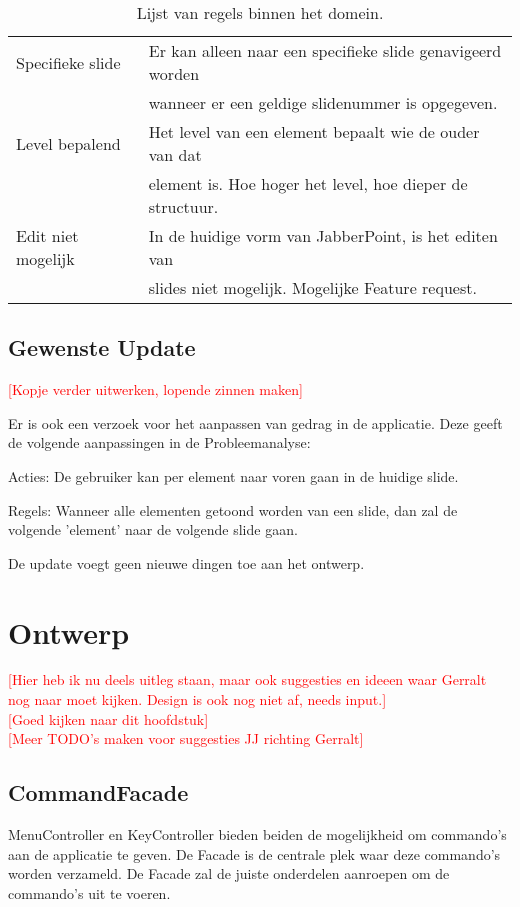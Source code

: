 \documentclass[a4paper]{article}
\newcommand{\todo}[1]{\textcolor{red}{[#1]}}
\newcommand{\1}[0]{\'{e}\'{e}n}
\begin{document}
\begin{table}[!h]
\begin{tabular}{ll}
 	Specifieke slide & Er kan alleen naar een specifieke slide genavigeerd worden \\& wanneer er een geldige slidenummer is opgegeven.\\
 	Level bepalend & Het level van een element bepaalt wie de ouder van dat \\& element is. Hoe hoger het level, hoe dieper de structuur.\\
 	Edit niet mogelijk & In de huidige vorm van JabberPoint, is het editen van \\& slides niet mogelijk. Mogelijke Feature request.\\
  	\bottomrule
	\end{tabular}
\caption{Lijst van regels binnen het domein.}
\label{table:regels}
\end{table}

\subsection{Gewenste Update}
\todo{Kopje verder uitwerken, lopende zinnen maken}

Er is ook een verzoek voor het aanpassen van gedrag in de applicatie. Deze geeft
de volgende aanpassingen in de Probleemanalyse:

Acties: De gebruiker kan per element naar voren gaan in de huidige slide.

Regels: Wanneer alle elementen getoond worden van een slide, dan zal de volgende
'element' naar de volgende slide gaan.

De update voegt geen nieuwe dingen toe aan het ontwerp.

\section{Ontwerp}
\label{sec:ontwerp}
\todo{Hier heb ik nu deels uitleg staan, maar ook suggesties en ideeen waar
Gerralt nog naar moet kijken. Design is ook nog niet af, needs input.}
\\
\todo{Goed kijken naar dit hoofdstuk}
\\
\todo{Meer TODO's maken voor suggesties JJ richting Gerralt}

\subsection{CommandFacade}
MenuController en KeyController bieden beiden de mogelijkheid om commando's aan
de applicatie te geven. De Facade is de centrale plek waar deze commando's
worden verzameld. De Facade zal de juiste onderdelen aanroepen om de commando's
uit te voeren.
\end{document}
